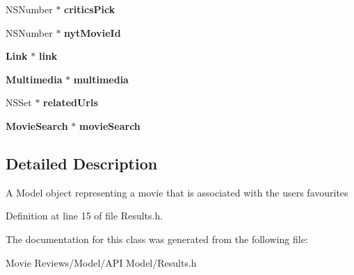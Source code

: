 \begin{DoxyCompactItemize}
\item 
N\+S\+Number $\ast$ {\bfseries critics\+Pick}\label{interface_results_a95fc4138585789279c8ed25d924e7da9}

\item 
N\+S\+Number $\ast$ {\bfseries nyt\+Movie\+Id}\label{interface_results_a0b0e633de5f629995615431915e29c5f}

\item 
{\bf Link} $\ast$ {\bfseries link}\label{interface_results_a6967f4a51c72587ced389b4ec0731fae}

\item 
{\bf Multimedia} $\ast$ {\bfseries multimedia}\label{interface_results_a09c7cc19c7c3cfd106471c19611b8a17}

\item 
N\+S\+Set $\ast$ {\bfseries related\+Urls}\label{interface_results_af7b5e7d47ec457a9ee83bc395aa29b30}

\item 
{\bf Movie\+Search} $\ast$ {\bfseries movie\+Search}\label{interface_results_a9b33b8fc45385c0074598afc7f8e630a}

\end{DoxyCompactItemize}


\subsection{Detailed Description}
A Model object representing a movie that is associated with the user\textquotesingle{}s favourites 

Definition at line 15 of file Results.\+h.



The documentation for this class was generated from the following file\+:\begin{DoxyCompactItemize}
\item 
Movie Reviews/\+Model/\+A\+P\+I Model/Results.\+h\end{DoxyCompactItemize}
